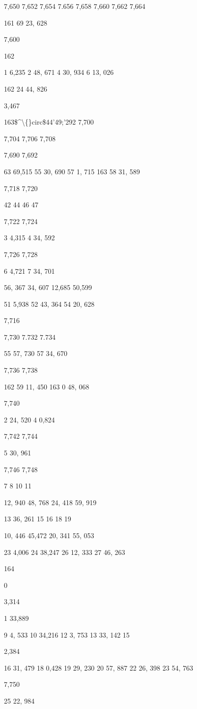 \documentclass[10pt,a4paper]{article}
\begin{document}
7,650
7,652
7,654
7.656
7,658
7,660
7,662
7,664

161 69 23, 628

7,600

162

1 6,235
2 48, 671
4 30, 934
6 13, 026

162 24 44, 826

3,467

163\$\textasciicircum{}\textbackslash\{\}circ\$44'49;'292
7,700

7,704
7,706
7,708

7,690
7,692

63 69,515
55 30, 690
57
1, 715
163 58 31, 589

7,718
7,720

42
44
46
47

7,722
7,724

3 4,315
4 34, 592

7,726
7,728

6 4,721
7 34, 701

56, 367
34, 607
12,685
50,599

51 5,938
52 43, 364
54 20, 628

7,716

7,730
7.732
7.734

55 57, 730
57 34, 670

7,736
7,738

162 59 11, 450
163 0 48, 068

7,740

2 24, 520
4 0,824

7,742
7,744

5 30, 961

7,746
7,748

7
8
10
11

12, 940
48, 768
24, 418
59, 919

13 36, 261
15
16
18
19

10, 446
45,472
20, 341
55, 053

23 4,006
24 38,247
26 12, 333
27 46, 263

164

0

3,314

1 33,889

9 4, 533
10 34,216
12 3, 753
13 33, 142
15

2,384

16 31, 479
18 0,428
19 29, 230
20 57, 887
22 26, 398
23 54, 763

7,750

25 22, 984
\end{document}
